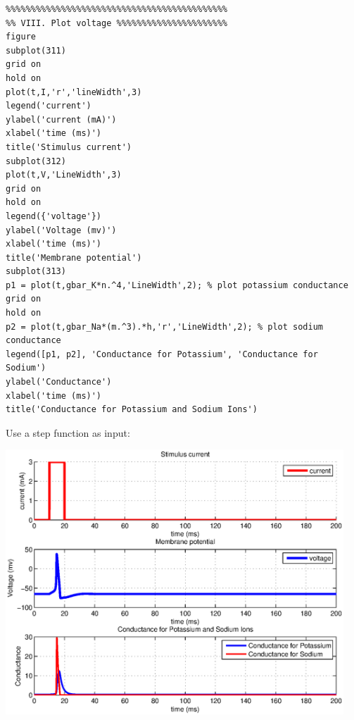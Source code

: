 \documentclass[12pt]{article}
\newenvironment{exercise}[2][Exercise]{\begin{trivlist}
\item[\hskip \labelsep {\bfseries #1}\hskip \labelsep {\bfseries #2.}]}{\end{trivlist}}
\begin{document}
\begin{exercise}{2.3}
\begin{enumerate}
\begin{tiny}
\begin{lstlisting}
%%%%%%%%%%%%%%%%%%%%%%%%%%%%%%%%%%%%%%%%%%%%
%% VIII. Plot voltage %%%%%%%%%%%%%%%%%%%%%%
figure
subplot(311)
grid on
hold on
plot(t,I,'r','lineWidth',3)
legend('current')
ylabel('current (mA)')
xlabel('time (ms)')
title('Stimulus current')
subplot(312)
plot(t,V,'LineWidth',3)
grid on
hold on
legend({'voltage'})
ylabel('Voltage (mv)')
xlabel('time (ms)')
title('Membrane potential')
subplot(313)
p1 = plot(t,gbar_K*n.^4,'LineWidth',2); % plot potassium conductance
grid on
hold on
p2 = plot(t,gbar_Na*(m.^3).*h,'r','LineWidth',2); % plot sodium conductance
legend([p1, p2], 'Conductance for Potassium', 'Conductance for Sodium')
ylabel('Conductance')
xlabel('time (ms)')
title('Conductance for Potassium and Sodium Ions')
\end{lstlisting}
\end{tiny}
\end{enumerate}
Use a step function as input:

  \includegraphics[width=5in]{exercise1d.eps}

\end{exercise}
\end{document}

